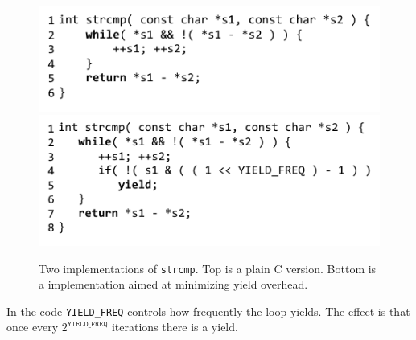 \documentclass[acmsmall,anonymous,review]{acmart}\settopmatter{printfolios=true,printccs=false,printacmref=false}
\begin{document}
\begin{figure}[htp]
\includegraphics[left]{Code/plain_strcmp}%
  \\
\includegraphics[left]{Code/strcmp_benchmark}%
\caption{Two implementations of \texttt{strcmp}.
  Top is a plain C version.
  Bottom is a \charcoal{} implementation aimed at minimizing yield overhead.}

\label{fig:strcmp}

\end{figure}



In the code \texttt{YIELD\_FREQ} controls how frequently the loop yields.
The effect is that once every $2^{\mathtt{YIELD\_FREQ}}$ iterations there is a yield.
\end{document}
